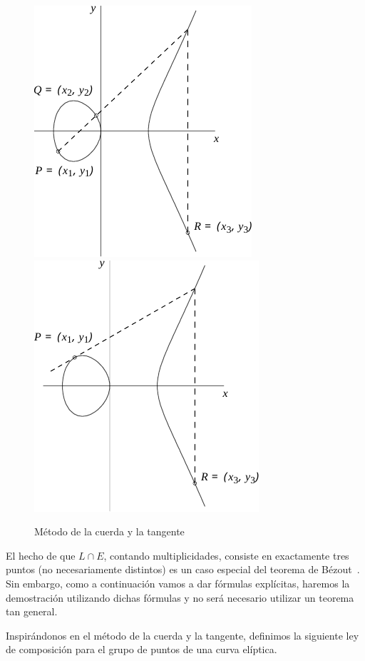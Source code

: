 \begin{figure}[h]
  \myfloatalign
  {\includegraphics[width=.45\linewidth]{gfx/ejemplo_adiccion.pdf}}
  \quad
  {\includegraphics[width=.45\linewidth]{gfx/ejemplo_duplicacion.pdf}}
  \caption{Método de la cuerda y la tangente}\label{fig:Método de la cuerda y la tangente}
\end{figure}

\begin{nota}
El hecho de que $L \cap E$, contando multiplicidades, consiste en exactamente tres puntos (no necesariamente distintos) es un caso especial del teorema de Bézout~\cite[sec. I.7.8]{Hartshorne:1977}. Sin embargo, como a continuación vamos a dar fórmulas explícitas, haremos la demostración utilizando dichas fórmulas y no será necesario utilizar un teorema tan general.
\end{nota}

Inspirándonos en el método de la cuerda y la tangente, definimos la siguiente ley de composición para el grupo de puntos de una curva elíptica.

